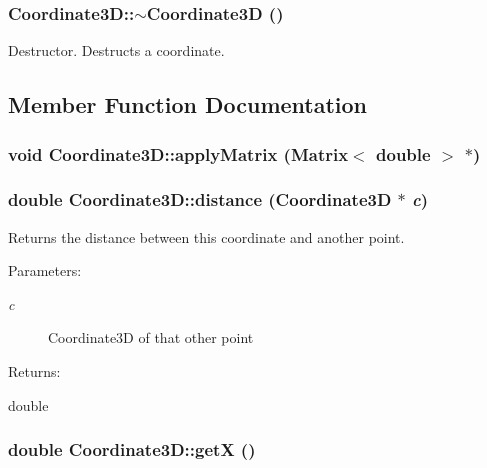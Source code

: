 \subsubsection{\setlength{\rightskip}{0pt plus 5cm}Coordinate3D::$\sim$Coordinate3D ()}\label{classCoordinate3D_a2}


Destructor. Destructs a coordinate. 

\subsection{Member Function Documentation}
\subsubsection{\setlength{\rightskip}{0pt plus 5cm}void Coordinate3D::apply\-Matrix ({\bf Matrix}$<$ double $>$ $\ast$)}\label{classCoordinate3D_a11}


\subsubsection{\setlength{\rightskip}{0pt plus 5cm}double Coordinate3D::distance (Coordinate3D $\ast$ {\em c})\hspace{0.3cm}{\tt  [inline]}}\label{classCoordinate3D_a9}


Returns the distance between this coordinate and another point. \begin{Desc}
\item[Parameters: ]\par
\begin{description}
\item[{\em 
c}]Coordinate3D of that other point \end{description}
\end{Desc}
\begin{Desc}
\item[Returns: ]\par
double \end{Desc}
\subsubsection{\setlength{\rightskip}{0pt plus 5cm}double Coordinate3D::get\-X ()\hspace{0.3cm}{\tt  [inline]}}\label{classCoordinate3D_a6}


